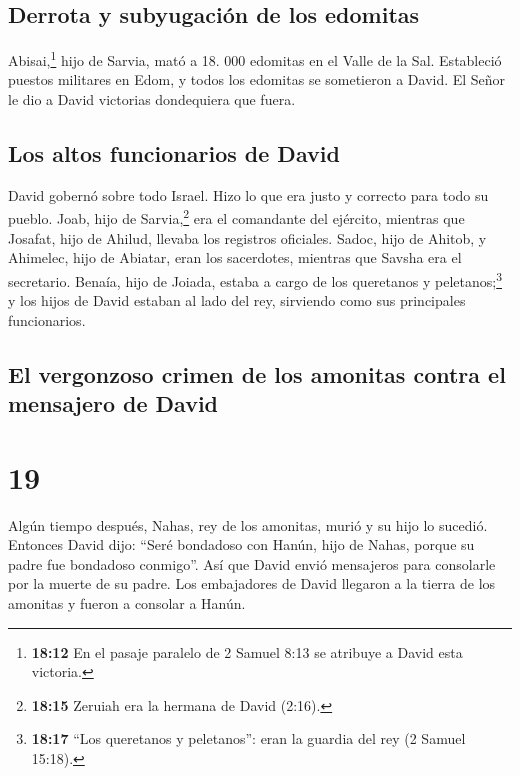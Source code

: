 \hypertarget{derrota-y-subyugaciuxf3n-de-los-edomitas}{%
\subsection{Derrota y subyugación de los
edomitas}\label{derrota-y-subyugaciuxf3n-de-los-edomitas}}

 Abisai,\footnote{\textbf{18:12} En el pasaje paralelo de
  2 Samuel 8:13 se atribuye a David esta victoria.} hijo de Sarvia, mató
a 18. 000 edomitas en el Valle de la Sal.  Estableció
puestos militares en Edom, y todos los edomitas se sometieron a David.
El Señor le dio a David victorias dondequiera que fuera.

\hypertarget{los-altos-funcionarios-de-david}{%
\subsection{Los altos funcionarios de
David}\label{los-altos-funcionarios-de-david}}

 David gobernó sobre todo Israel. Hizo lo que era justo y
correcto para todo su pueblo.  Joab, hijo de
Sarvia,\footnote{\textbf{18:15} Zeruiah era la hermana de David (2:16).}
era el comandante del ejército, mientras que Josafat, hijo de Ahilud,
llevaba los registros oficiales.  Sadoc, hijo de Ahitob,
y Ahimelec, hijo de Abiatar, eran los sacerdotes, mientras que Savsha
era el secretario.  Benaía, hijo de Joiada, estaba a
cargo de los queretanos y peletanos;\footnote{\textbf{18:17} ``Los
  queretanos y peletanos'': eran la guardia del rey (2 Samuel 15:18).} y
los hijos de David estaban al lado del rey, sirviendo como sus
principales funcionarios.

\hypertarget{el-vergonzoso-crimen-de-los-amonitas-contra-el-mensajero-de-david}{%
\subsection{El vergonzoso crimen de los amonitas contra el mensajero de
David}\label{el-vergonzoso-crimen-de-los-amonitas-contra-el-mensajero-de-david}}

\hypertarget{section-18}{%
\section{19}\label{section-18}}

 Algún tiempo después, Nahas, rey de los amonitas, murió y
su hijo lo sucedió.  Entonces David dijo: ``Seré bondadoso
con Hanún, hijo de Nahas, porque su padre fue bondadoso conmigo''. Así
que David envió mensajeros para consolarle por la muerte de su padre.
Los embajadores de David llegaron a la tierra de los amonitas y fueron a
consolar a Hanún.

